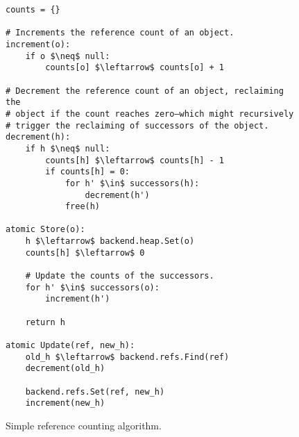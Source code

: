 \begin{figure}[!ht]
  \caption{Simple reference counting algorithm.}
  \label{alg:ref-count}

  \centering
  \begin{lstlisting}
counts = {}

# Increments the reference count of an object.
increment(o):
    if o $\neq$ null:
        counts[o] $\leftarrow$ counts[o] + 1

# Decrement the reference count of an object, reclaiming the
# object if the count reaches zero–which might recursively
# trigger the reclaiming of successors of the object.
decrement(h):
    if h $\neq$ null:
        counts[h] $\leftarrow$ counts[h] - 1
        if counts[h] = 0:
            for h' $\in$ successors(h):
                decrement(h')
            free(h)

atomic Store(o):
    h $\leftarrow$ backend.heap.Set(o)
    counts[h] $\leftarrow$ 0

    # Update the counts of the successors.
    for h' $\in$ successors(o):
        increment(h')

    return h

atomic Update(ref, new_h):
    old_h $\leftarrow$ backend.refs.Find(ref)
    decrement(old_h)

    backend.refs.Set(ref, new_h)
    increment(new_h)
\end{lstlisting}
\end{figure}
